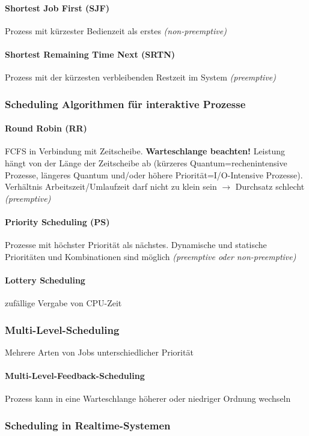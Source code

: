 \documentclass[11pt,a4paper,landscape]{article}
\begin{document}
\begin{multicols*}{3}
	\paragraph{Shortest Job First (SJF)} Prozess mit kürzester Bedienzeit als erstes \textit{(non-preemptive)}
	\paragraph{Shortest Remaining Time Next (SRTN)} Prozess mit der kürzesten verbleibenden Restzeit im System \textit{(preemptive)}
	\subsubsection{Scheduling Algorithmen für interaktive Prozesse}
	\paragraph{Round Robin (RR)} FCFS in Verbindung mit Zeitscheibe. \textbf{Warteschlange beachten!} Leistung hängt von der Länge der Zeitscheibe ab (kürzeres Quantum=rechenintensive Prozesse, längeres Quantum und/oder höhere Priorität=I/O-Intensive Prozesse). Verhältnis Arbeitszeit/Umlaufzeit darf nicht zu klein sein $\rightarrow$ Durchsatz schlecht \textit{(preemptive)}
	\paragraph{Priority Scheduling (PS)} Prozesse mit höchster Priorität als nächstes. Dynamische und statische Prioritäten und Kombinationen sind möglich \textit{(preemptive oder non-preemptive)}
	\paragraph{Lottery Scheduling} zufällige Vergabe von CPU-Zeit
	\subsubsection{Multi-Level-Scheduling}
	Mehrere Arten von Jobs unterschiedlicher Priorität
	\paragraph{Multi-Level-Feedback-Scheduling} Prozess kann in eine Warteschlange höherer oder niedriger Ordnung wechseln
	\subsubsection{Scheduling in Realtime-Systemen}

\end{multicols*}
\end{document}
